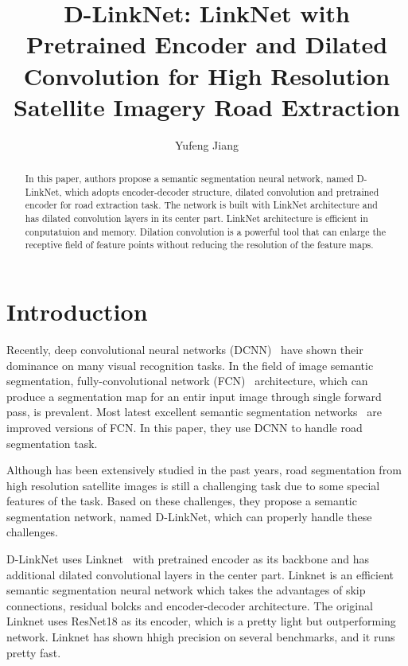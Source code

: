 \documentclass[10pt,twocolumn,letterpaper]{article}
\begin{document}
\title{D-LinkNet: LinkNet with Pretrained Encoder and Dilated Convolution for High Resolution Satellite Imagery Road Extraction}
\author{Yufeng Jiang}
\maketitle

\begin{abstract}

In this paper, authors propose a semantic segmentation neural network, named D-LinkNet, which adopts encoder-decoder structure, dilated convolution and pretrained encoder for road extraction task. The network is built with LinkNet architecture and has dilated convolution layers in its center part. LinkNet architecture is efficient in conputatuion and memory. Dilation convolution is a powerful tool that can enlarge the receptive field of feature points without reducing the resolution of the feature maps. 

\end{abstract}

\section{Introduction}

Recently, deep convolutional neural networks (DCNN)~\cite{8,9} have shown their dominance on many visual recognition tasks. In the field of image semantic segmentation, fully-convolutional network (FCN)~\cite{12} architecture, which can produce a segmentation map for an entir input image through single forward pass, is prevalent. Most latest excellent semantic segmentation networks~\cite{13} are improved versions of FCN. In this paper, they use DCNN to handle road segmentation task. 

Although has been extensively studied in the past years, road segmentation from high resolution satellite images is still a challenging task due to some special features of the task. Based on these challenges, they propose a semantic segmentation network, named D-LinkNet, which can properly handle these challenges.

D-LinkNet uses Linknet~\cite{15} with pretrained encoder as its backbone and has additional dilated convolutional layers in the center part. Linknet is an efficient semantic segmentation neural network which takes the advantages of skip connections, residual bolcks and encoder-decoder architecture. The original Linknet uses ResNet18 as its encoder, which is a pretty light but outperforming network. Linknet has shown hhigh precision on several benchmarks, and it runs pretty fast. 
\end{document}
